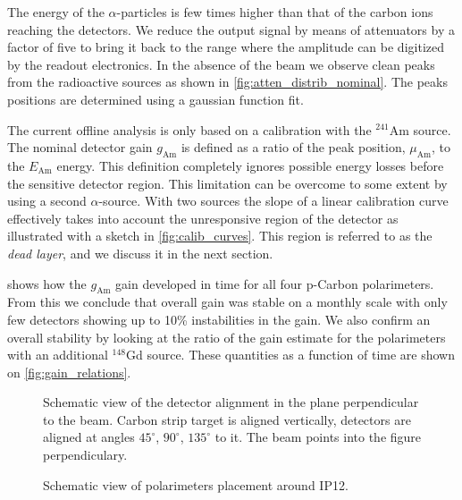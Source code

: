 \documentclass[a4paper,12pt]{article}
\newcommand\americium{${}^{241}$Am}
\newcommand\gadolinium{${}^{148}$Gd}
\newcommand\gainAm{$g_\text{Am}$}
\begin{document}
The energy of the $\alpha$-particles is few times higher than that of the
carbon ions reaching the detectors. We reduce the output signal by means of
attenuators by a factor of five to bring it back to the range where the
amplitude can be digitized by the readout electronics. In the absence of the
beam we observe clean peaks from the radioactive sources as shown in
\cref{fig:atten_distrib_nominal}. The peaks positions are determined using a
gaussian function fit.

The current offline analysis is only based on a calibration with the \americium{} source.
The nominal detector gain \gainAm{} is
defined as a ratio of the peak position, $\mu_{\text{Am}}$, to the
$E_{\text{Am}}$ energy. This definition completely ignores possible energy
losses before the sensitive detector region. This limitation can be overcome
to some extent by using a second $\alpha$-source. With two sources the slope of
a linear calibration curve effectively takes into account the unresponsive
region of the detector as illustrated with a sketch in
\cref{fig:calib_curves}. This region is referred to as the {\it dead
layer}, and we discuss it in the next section.

 shows how the \gainAm{} gain developed in time for all
four p-Carbon polarimeters. From this we conclude that overall gain was
stable on a monthly scale with only few detectors showing up to 10\%
instabilities in the gain. We also confirm an overall stability by looking at
the ratio of the gain estimate for the polarimeters with an additional
\gadolinium{} source. These quantities as a function of time are shown on
\cref{fig:gain_relations}.


\newcommand\amgainlabel{Time dependence of the detector gain $g_\text{Am}$ as
measured with $\alpha$-particles emitted by the \americium{} source. Colors
represent individual detectors.}

\begin{figure}
\begin{center}

\end{center}
\caption{Schematic view of the detector alignment in the plane perpendicular to
the beam. Carbon strip target is aligned vertically, detectors are aligned at
angles $45^\circ$, $90^\circ$, $135^\circ$ to it. The beam points into the
figure perpendiculary.}
\end{figure}

\begin{figure}
\begin{center}

\end{center}
\caption{Schematic view of polarimeters placement around IP12.}
\end{figure}
\end{document}
